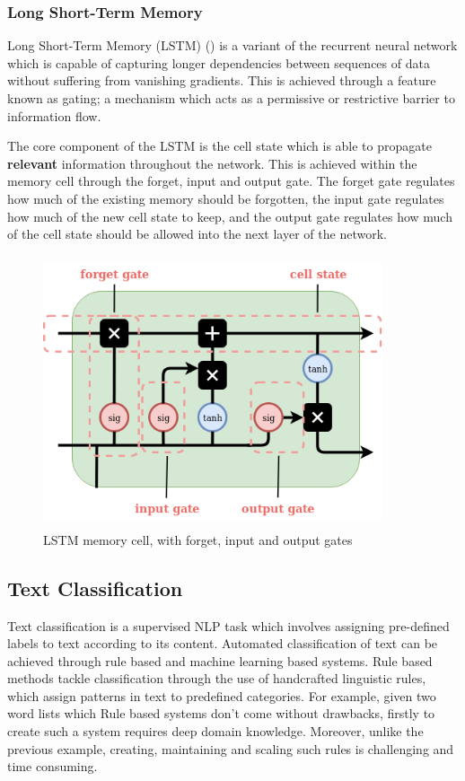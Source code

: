 \subsubsection{Long Short-Term Memory}
Long Short-Term Memory (LSTM) (\cite{Hochreiter1997}) is a variant of the recurrent neural network which is capable of capturing longer dependencies between sequences of data without suffering from vanishing gradients. This is achieved through a feature known as gating; a mechanism which acts as a permissive or restrictive barrier to information flow. 

\noindent
\newline
The core component of the LSTM is the cell state which is able to propagate \textbf{relevant} information throughout the network. This is achieved within the memory cell through the forget, input and output gate. The forget gate regulates how much of the existing memory should be forgotten, the input gate regulates how much of the new cell state to keep, and the output gate regulates how much of the cell state should be allowed into the next layer of the network.

\begin{figure}[h]
	\includegraphics[width=10cm, height=8cm]{./figures/fig4}
	\centering
	\caption{LSTM memory cell, with forget, input and output gates}
	\label{fig:fig4}
\end{figure}

\subsection{Text Classification}
Text classification is a supervised NLP task which involves assigning pre-defined labels to text according to its content. Automated classification of text can be achieved through rule based and machine learning based systems. Rule based methods tackle classification through the use of handcrafted linguistic rules, which assign patterns in text to predefined categories. For example, given two word lists which  Rule based systems don't come without drawbacks, firstly to create such a system requires deep domain knowledge. Moreover, unlike the previous example, creating, maintaining and scaling such rules is challenging and time consuming. 
